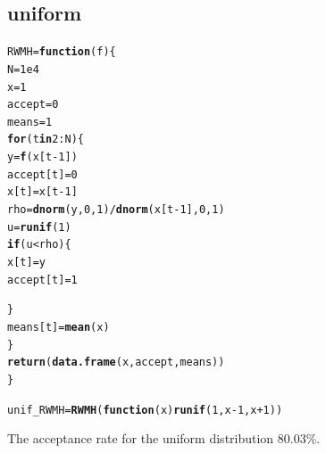 \documentclass{article}\usepackage[]{graphicx}\usepackage[]{color}
\makeatletter
\newcommand{\hlnum}[1]{\textcolor[rgb]{0.686,0.059,0.569}{#1}}%
\newcommand{\hlopt}[1]{\textcolor[rgb]{0,0,0}{#1}}%
\newcommand{\hlstd}[1]{\textcolor[rgb]{0.345,0.345,0.345}{#1}}%
\newcommand{\hlkwa}[1]{\textcolor[rgb]{0.161,0.373,0.58}{\textbf{#1}}}%
\newcommand{\hlkwb}[1]{\textcolor[rgb]{0.69,0.353,0.396}{#1}}%
\newcommand{\hlkwc}[1]{\textcolor[rgb]{0.333,0.667,0.333}{#1}}%
\newcommand{\hlkwd}[1]{\textcolor[rgb]{0.737,0.353,0.396}{\textbf{#1}}}%
\newenvironment{kframe}{%
 \def\at@end@of@kframe{}%
 \ifinner\ifhmode%
  \def\at@end@of@kframe{\end{minipage}}%
  \begin{minipage}{\columnwidth}%
 \fi\fi%
 \def\FrameCommand##1{\hskip\@totalleftmargin \hskip-\fboxsep
 \colorbox{shadecolor}{##1}\hskip-\fboxsep
     \hskip-\linewidth \hskip-\@totalleftmargin \hskip\columnwidth}%
 \MakeFramed {\advance\hsize-\width
   \@totalleftmargin\z@ \linewidth\hsize
   \@setminipage}}%
 {\par\unskip\endMakeFramed%
 \at@end@of@kframe}
\newenvironment{knitrout}{}{} %
\makeatother
\begin{document}
\subsection*{uniform}
\begin{knitrout}
\color{fgcolor}\begin{kframe}
\begin{alltt}
\hlstd{RWMH} \hlkwb{=} \hlkwa{function}\hlstd{(}\hlkwc{f}\hlstd{)\{}
  \hlstd{N} \hlkwb{=} \hlnum{1e4}
\hlstd{x} \hlkwb{=} \hlnum{1}
\hlstd{accept} \hlkwb{=} \hlnum{0}
\hlstd{means} \hlkwb{=} \hlnum{1}
\hlkwa{for}\hlstd{(t} \hlkwa{in} \hlnum{2}\hlopt{:}\hlstd{N)\{}
  \hlstd{y} \hlkwb{=} \hlkwd{f}\hlstd{(x[t}\hlopt{-}\hlnum{1}\hlstd{])}
  \hlstd{accept[t]} \hlkwb{=} \hlnum{0}
  \hlstd{x[t]} \hlkwb{=}\hlstd{x[t}\hlopt{-}\hlnum{1}\hlstd{]}
  \hlstd{rho} \hlkwb{=} \hlkwd{dnorm}\hlstd{(y,}\hlnum{0}\hlstd{,}\hlnum{1}\hlstd{)}\hlopt{/}\hlkwd{dnorm}\hlstd{(x[t}\hlopt{-}\hlnum{1}\hlstd{],}\hlnum{0}\hlstd{,}\hlnum{1}\hlstd{)}
  \hlstd{u} \hlkwb{=} \hlkwd{runif}\hlstd{(}\hlnum{1}\hlstd{)}
      \hlkwa{if}\hlstd{(u}\hlopt{<}\hlstd{rho)\{}
        \hlstd{x[t]} \hlkwb{=} \hlstd{y}
        \hlstd{accept[t]} \hlkwb{=} \hlnum{1}

        \hlstd{\}}
  \hlstd{means[t]} \hlkwb{=} \hlkwd{mean}\hlstd{(x)}
\hlstd{\}}
  \hlkwd{return}\hlstd{(}\hlkwd{data.frame}\hlstd{(x, accept, means))}
\hlstd{\}}

\hlstd{unif_RWMH} \hlkwb{=} \hlkwd{RWMH}\hlstd{(}\hlkwa{function}\hlstd{(}\hlkwc{x}\hlstd{)} \hlkwd{runif}\hlstd{(}\hlnum{1}\hlstd{, x}\hlopt{-}\hlnum{1}\hlstd{, x}\hlopt{+}\hlnum{1}\hlstd{))}
\end{alltt}
\end{kframe}
\end{knitrout}
The acceptance rate for the uniform distribution 80.03\%.
\end{document}
